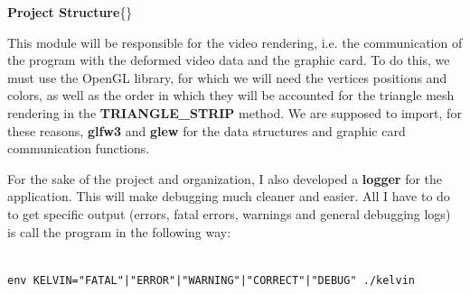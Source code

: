 \documentclass[12pt, a4paper]{report}
\newenvironment{loggentry}[2]%
{\noindent\textbf{#2}\newline\{\marginnote{#1}\}\newline\\}{\vspace{1.0cm}}
\begin{document}
\begin{loggentry}{(01 - 03)-06-2019}{Project Structure}
\begin{itemize}
				This module will be responsible for the video rendering, i.e. the communication of the program with the deformed  video data and the graphic card.
				To do this, we must use the OpenGL library, for which we will need the vertices positions and colors, as well as the order in which they will be accounted for the triangle mesh rendering in the \textbf{TRIANGLE\_STRIP} method.
				We are supposed to import, for these reasons, \textbf{glfw3} and \textbf{glew} for the data structures and graphic card communication functions.

		\end{itemize}

		For the sake of the project and organization, I also developed a \textbf{logger} for the application.
		This will make debugging much cleaner and easier.
		All I have to do to get specific output (errors, fatal errors, warnings and general debugging logs) is call the program in the following way:
	
	\begin{verbatim}

env KELVIN="FATAL"|"ERROR"|"WARNING"|"CORRECT"|"DEBUG" ./kelvin
	
	\end{verbatim}
	\end{loggentry}
\end{document}
